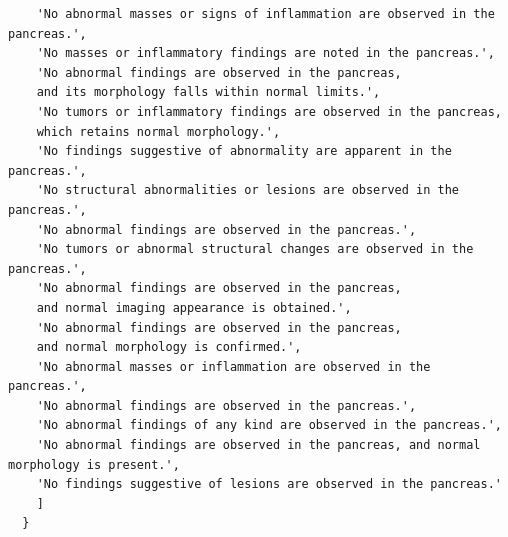 \documentclass[bioengineering,article,submit,pdftex,moreauthors]{Definitions/mdpi}
\begin{document}
\begin{verbatim}
    'No abnormal masses or signs of inflammation are observed in the pancreas.',
    'No masses or inflammatory findings are noted in the pancreas.',
    'No abnormal findings are observed in the pancreas, 
    and its morphology falls within normal limits.',
    'No tumors or inflammatory findings are observed in the pancreas, 
    which retains normal morphology.',
    'No findings suggestive of abnormality are apparent in the pancreas.',
    'No structural abnormalities or lesions are observed in the pancreas.',
    'No abnormal findings are observed in the pancreas.',
    'No tumors or abnormal structural changes are observed in the pancreas.',
    'No abnormal findings are observed in the pancreas, 
    and normal imaging appearance is obtained.',
    'No abnormal findings are observed in the pancreas, 
    and normal morphology is confirmed.',
    'No abnormal masses or inflammation are observed in the pancreas.',
    'No abnormal findings are observed in the pancreas.',
    'No abnormal findings of any kind are observed in the pancreas.',
    'No abnormal findings are observed in the pancreas, and normal morphology is present.',
    'No findings suggestive of lesions are observed in the pancreas.'
    ]
  }
\end{verbatim}


\end{document}
